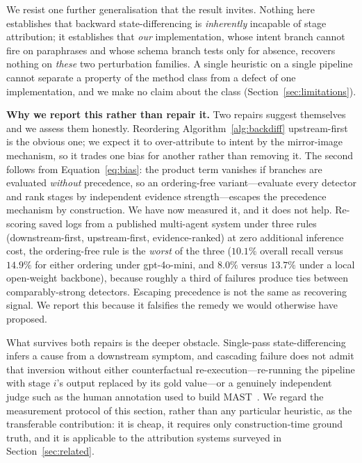 \documentclass[conference]{IEEEtran}
\begin{document}
We resist one further generalisation that the result invites. Nothing here
establishes that backward state-differencing is \emph{inherently} incapable of
stage attribution; it establishes that \emph{our} implementation, whose intent
branch cannot fire on paraphrases and whose schema branch tests only for
absence, recovers nothing on \emph{these} two perturbation families. A single
heuristic on a single pipeline cannot separate a property of the method class
from a defect of one implementation, and we make no claim about the class
(Section~\ref{sec:limitations}).

\noindent\textbf{Why we report this rather than repair it.} Two repairs suggest
themselves and we assess them honestly. Reordering
Algorithm~\ref{alg:backdiff} upstream-first is the obvious one; we expect it to
over-attribute to intent by the mirror-image mechanism, so it trades one bias
for another rather than removing it. The second follows from
Equation~\eqref{eq:bias}: the product term vanishes if branches are evaluated
\emph{without} precedence, so an ordering-free variant---evaluate every
detector and rank stages by independent evidence strength---escapes the
precedence mechanism by construction. We have now measured it, and it does not
help. Re-scoring saved logs from a published multi-agent system under three
rules (downstream-first, upstream-first, evidence-ranked) at zero additional
inference cost, the ordering-free rule is the \emph{worst} of the three
($10.1\%$ overall recall versus $14.9\%$ for either ordering under gpt-4o-mini, and
$8.0\%$ versus $13.7\%$ under a local open-weight backbone), because roughly a
third of failures produce ties between comparably-strong detectors. Escaping
precedence is not the same as recovering signal. We report this because it
falsifies the remedy we would otherwise have proposed.

What survives both repairs is the deeper obstacle. Single-pass
state-differencing infers a cause from a downstream symptom, and cascading
failure does not admit that inversion without either counterfactual
re-execution---re-running the pipeline with stage $i$'s output replaced by its
gold value---or a genuinely independent judge such as the human annotation used
to build MAST~\cite{cemri_mast_2025}. We regard the measurement protocol of
this section, rather than any particular heuristic, as the transferable
contribution: it is cheap, it requires only construction-time ground truth, and
it is applicable to the attribution systems surveyed in
Section~\ref{sec:related}.
\end{document}
